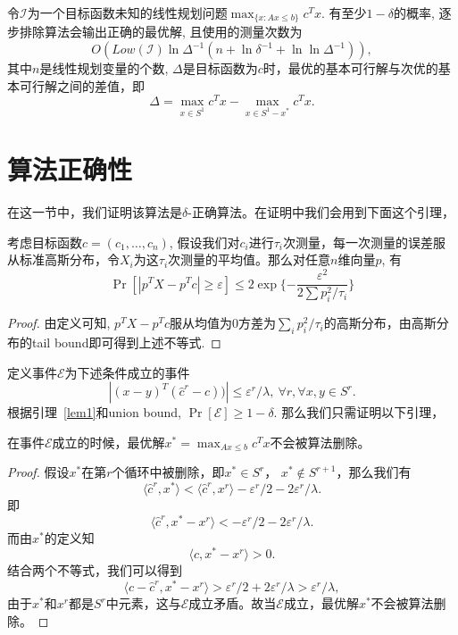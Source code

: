     \begin{theorem}
    令$\mathcal{I}$为一个目标函数未知的线性规划问题$\max_{\{x:Ax\le b\}} c^T x$. 有至少$1-\delta$的概率, 逐步排除算法会输出正确的最优解, 且使用的测量次数为
     \[
        O\left( Low(\mathcal{I}) \ln \Delta^{-1} ( n + \ln \delta^{-1} + \ln \ln \Delta^{-1})\right),
     \]
     其中$n$是线性规划变量的个数, $\Delta$是目标函数为$c$时，最优的基本可行解与次优的基本可行解之间的差值，即
     \[
     \Delta = \max_{x\in S^1} c^T x - \max_{x\in S^1 - x^*} c^T x.
     \]
    \end{theorem}
	
\section{算法正确性}
 在这一节中，我们证明该算法是$\delta$-正确算法。在证明中我们会用到下面这个引理，
    \begin{lemma}\label{lem1}
 考虑目标函数$c = (c_1, \dots, c_n)$, 假设我们对$c_i$进行$\tau_i$次测量，每一次测量的误差服从标准高斯分布，令$X_i$为这$\tau_i$次测量的平均值。那么对任意$n$维向量$p$, 有 
    \[
    \Pr\left[ |p^T X - p^T c|\ge \varepsilon\right] \le 2 \exp\{-\frac{\varepsilon^2}{2 \sum p_i^2/\tau_i}\}
    \]
    \end{lemma}
    \begin{proof}
    由定义可知, $p^T X - p^T c$服从均值为$0$方差为$\sum_i p_i^2/\tau_i$的高斯分布，由高斯分布的tail bound即可得到上述不等式. 
    \end{proof}
定义事件$\mathcal{E}$为下述条件成立的事件$$|(x-y)^T (\hat{c}^r - c))|\le \varepsilon^r /\lambda,\ \forall r, \forall x,y \in S^r.$$ 
根据引理~\ref{lem1}和union bound, $\Pr[\mathcal{E}]\ge 1-\delta$.  那么我们只需证明以下引理，
\begin{lemma}\label{correct}
在事件$\mathcal{E}$成立的时候，最优解$x^* = \max_{Ax\le b} c^T x$不会被算法删除。
\end{lemma}
\begin{proof}
假设$x^*$在第$r$个循环中被删除，即$x^* \in S^r$， $x^* \notin S^{r+1}$，那么我们有
\[
\langle \hat{c}^r, x^*\rangle < \langle \hat{c}^r, x^r\rangle-\varepsilon^r/2-2\varepsilon^r/\lambda.
\]
即
\[
\langle \hat{c}^r, x^* - x^r\rangle < -\varepsilon^r/2-2\varepsilon^r/\lambda.
\]
而由$x^*$的定义知
\[
\langle c, x^* - x^r\rangle > 0.
\]
结合两个不等式，我们可以得到
\[
\langle c - \hat{c}^r, x^* - x^r\rangle > \varepsilon^r/2 + 2\varepsilon^r/\lambda > \varepsilon^r /\lambda,
\]
由于$x^*$和$x^r$都是$S^r$中元素，这与$\mathcal{E}$成立矛盾。故当$\mathcal{E}$成立，最优解$x^*$不会被算法删除。
\end{proof}
